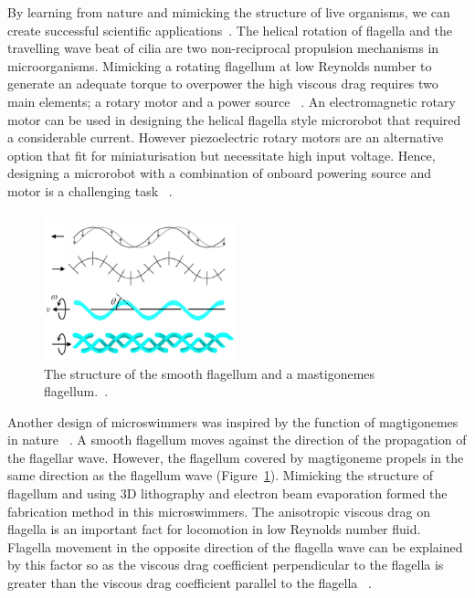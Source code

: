 \documentclass[a4paper,11pt]{article}
\begin{document}
\begin{sloppypar}
By learning from nature and mimicking the structure of live organisms, we can create successful  
scientific applications~\citep{qiunanohelices}. 
The helical rotation of flagella and the travelling wave beat of cilia are two non-reciprocal propulsion
 mechanisms in microorganisms. Mimicking a rotating flagellum at low Reynolds number to generate an 
adequate torque to overpower the high viscous drag requires two main elements; a rotary motor and a
 power source ~\citep{qiunanohelices}. 
An electromagnetic rotary motor can be used in designing the helical flagella style microrobot that 
required a considerable current. However piezoelectric rotary motors are an alternative option 
that fit for miniaturisation but necessitate high input voltage.  Hence, designing a microrobot with a 
combination of onboard powering source and motor is a challenging task ~\citep{qiunanohelices}.

\paragraph{}

\begin{figure}
  \begin{center}
    \includegraphics[width=0.5\textwidth]{10}
  \caption{ The structure of the smooth flagellum and a mastigonemes flagellum.~\citep{gao2013bioinspired}.}
  \label{10}
\end{center}
\end{figure}
Another design of microswimmers was inspired by the function of magtigonemes in nature ~\citep{tottori2013artificial}.
 A smooth flagellum moves against the direction of the propagation of the flagellar wave. However, 
the flagellum covered by magtigoneme propels in the same direction as the flagellum wave (Figure~\ref{10}). Mimicking 
the structure of flagellum and using 3D lithography and electron beam evaporation formed the fabrication 
method in this microswimmers.
The anisotropic viscous drag on flagella is an important fact for locomotion in low Reynolds number fluid. 
Flagella movement in the opposite direction of the flagella wave can be explained by this factor so as the 
viscous drag coefficient perpendicular to the flagella is greater than the viscous drag coefficient parallel to 
the flagella ~\citep{tottori2013artificial}. 


\end{sloppypar}
\end{document}
